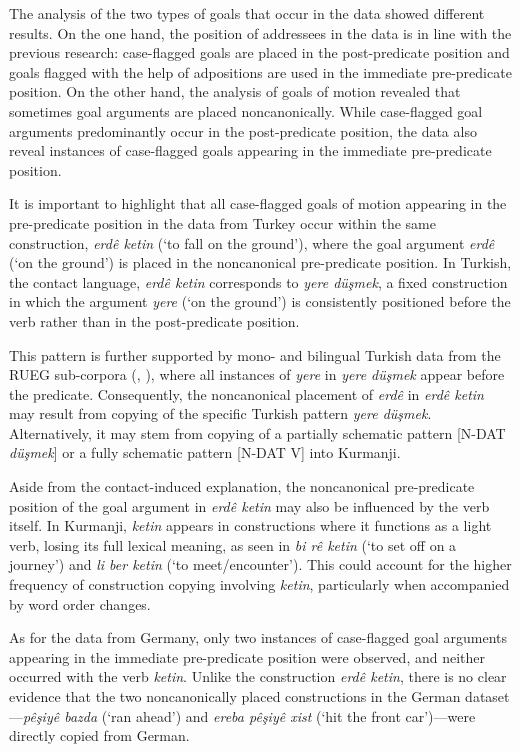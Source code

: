 The analysis of the two types of goals that occur in the data showed different results. On the one hand, the position of addressees in the data is in line with the previous research: case-flagged goals are placed in the post-predicate position and goals flagged with the help of adpositions are used in the immediate pre-predicate position. On the other hand, the analysis of goals of motion revealed that sometimes goal arguments are placed noncanonically. While case-flagged goal arguments predominantly occur in the post-predicate position, the data also reveal instances of case-flagged goals appearing in the immediate pre-predicate position.

It is important to highlight that all case-flagged goals of motion appearing in the pre-predicate position in the data from Turkey occur within the same construction, \textit{erdê ketin} (‘to fall on the ground’), where the goal argument \textit{erdê} (‘on the ground’) is placed in the noncanonical pre-predicate position. In Turkish, the contact language, \textit{erdê ketin} corresponds to \textit{yere düşmek}, a fixed construction in which the argument \textit{yere} (‘on the ground’) is consistently positioned before the verb rather than in the post-predicate position.

This pattern is further supported by mono- and bilingual Turkish data from the RUEG sub-corpora (\citealt{LudelingEtAl2024}, \citealt{IefremenkoEtAl2024}), where all instances of \textit{yere} in \textit{yere düşmek} appear before the predicate. Consequently, the noncanonical placement of \textit{erdê} in \textit{erdê ketin} may result from copying of the specific Turkish pattern \textit{yere düşmek}. Alternatively, it may stem from copying of a partially schematic pattern [N-DAT \textit{düşmek}] or a fully schematic pattern [N-DAT V] into Kurmanji.

Aside from the contact-induced explanation, the noncanonical pre-predicate position of the goal argument in \textit{erdê ketin} may also be influenced by the verb itself. In Kurmanji, \textit{ketin} appears in constructions where it functions as a light verb, losing its full lexical meaning, as seen in \textit{bi rê ketin} (‘to set off on a journey’) and \textit{li ber ketin} (‘to meet/encounter’). This could account for the higher frequency of construction copying involving \textit{ketin}, particularly when accompanied by word order changes.

As for the data from Germany, only two instances of case-flagged goal arguments appearing in the immediate pre-predicate position were observed, and neither occurred with the verb \textit{ketin}. Unlike the construction \textit{erdê ketin}, there is no clear evidence that the two noncanonically placed constructions in the German dataset—\textit{pêşiyê bazda} (‘ran ahead’) and \textit{ereba pêşiyê xist} (‘hit the front car’)—were directly copied from German.

